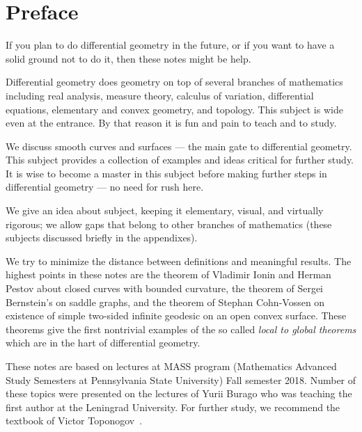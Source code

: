 
\chapter*{Preface}

If you plan to do differential geometry in the future,
or if you want to have a solid ground not to do it,
then these notes might be help.

Differential geometry does geometry on top of several branches of mathematics including 
real analysis, 
measure theory,
calculus of variation,
differential equations,
elementary and convex geometry,
and topology.
This subject is wide even at the entrance. 
By that reason it is fun and pain to teach and to study.

We discuss smooth curves and surfaces --- the main gate to differential geometry.
This subject provides a collection of examples and ideas critical for further study.
It is wise to become a master in this subject before making further steps in differential geometry --- no need for rush here.

We give an idea about subject, keeping it elementary, visual, and virtually rigorous; we allow gaps that belong to other branches of mathematics (these subjects discussed briefly in the appendixes).

We try to minimize the distance between definitions and meaningful results.
The highest points in these notes are
the theorem of Vladimir Ionin and Herman Pestov about closed curves with bounded curvature,
the theorem of Sergei Bernstein's on saddle graphs,
and the theorem of Stephan Cohn-Vossen on existence of simple two-sided infinite geodesic on an open convex surface.
These theorems give the first nontrivial examples of the so called \emph{local to global theorems} which are in the hart of differential geometry. 

These notes are based on lectures at MASS program (Mathematics Advanced Study Semesters at Pennsylvania State University) Fall semester 2018.
Number of these topics were presented on the lectures of Yurii Burago who was teaching the first author at the Leningrad University.
For further study, we recommend the textbook of Victor Toponogov~\cite{toponogov}.
